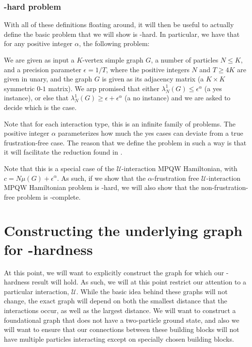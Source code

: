 \documentclass[../thesis-main/thesis-main]{subfiles}
\begin{document}
\subsubsection{\QMA-hard problem}

With all of these definitions floating around, it will then be useful to actually define the basic problem that we will show is \QMA-hard.  In particular, we have that for any positive integer $\alpha$, the following problem:

\begin{problem}
  We are given as input a $K$-vertex simple graph $G$, a number of particles $N\leq K$, and a precision parameter $\epsilon = 1/T$, where the positive integers $N$ and $T \geq 4K$ are given in unary, and the graph $G$ is given as its adjacency matrix (a $K\times K$ symmetric $0$-$1$ matrix). We arp promised that either $\lambda_N^1(G) \leq \epsilon^\alpha$ (a yes instance), or else that $\lambda_N^1(G) \geq \epsilon + \epsilon^\alpha$ (a no instance) and we are asked to decide which is the case.
\end{problem}

Note that for each interaction type, this is an infinite family of problems.  The positive integer $\alpha$ parameterizes how much the yes cases can deviate from a true frustration-free case.  The reason that we define the problem in such a way is that it will facilitate the reduction found in .

Note that this is a special case of the $\mathcal{U}$-interaction MPQW Hamiltonian, with $c = N\mu(G) + \epsilon^\alpha$.  As such, if we show that the $\alpha$-frustration free $\mathcal{U}$-interaction MPQW Hamiltonian problem is \QMA-hard, we will also show that the non-frustration-free problem is \QMA-complete.


\section{Constructing the underlying graph for \QMA-hardness}

At this point, we will want to explicitly construct the graph for which our \QMA-hardness result will hold.  As such, we will at this point restrict our attention to a particular interaction, $\mathcal{U}$.  While the basic idea behind these graphs will not change, the exact graph will depend on both the smallest distance that the interactions occur, as well as the largest distance.  We will want to construct a foundational graph that does not have a two-particle ground state, and also we will want to ensure that our connections between these building blocks will not have multiple particles interacting except on specially chosen building blocks.
\end{document}
